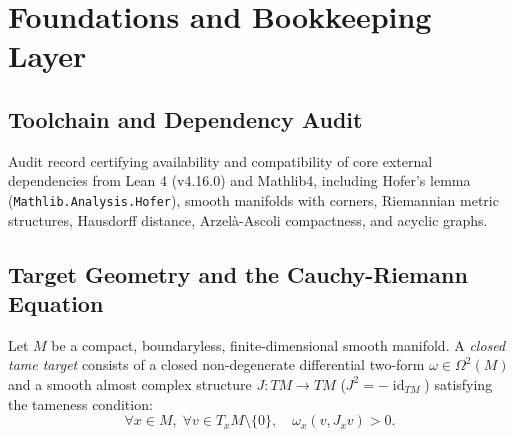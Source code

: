 
\chapter{Foundations and Bookkeeping Layer}

\section{Toolchain and Dependency Audit}

\begin{definition}
\label{f00:library_audit}
\leanok
Audit record certifying availability and compatibility of core external dependencies from Lean 4 (v4.16.0) and Mathlib4,
including Hofer's lemma (\texttt{Mathlib.Analysis.Hofer}), smooth manifolds with corners,
Riemannian metric structures, Hausdorff distance, Arzelà-Ascoli compactness, and acyclic graphs.
\end{definition}

\section{Target Geometry and the Cauchy-Riemann Equation}

\begin{definition}
\label{f01:target_geometry}
\leanok
{}
Let $M$ be a compact, boundaryless, finite-dimensional smooth manifold. A \emph{closed tame target} consists of a closed non-degenerate differential two-form $\omega \in \Omega^2(M)$ and a smooth almost complex structure $J: TM \to TM$ ($J^2 = -\operatorname{id}_{TM}$) satisfying the tameness condition:
\[
\forall x \in M, \; \forall v \in T_x M \setminus \{0\}, \quad \omega_x(v, J_x v) > 0.
\]
\end{definition}

